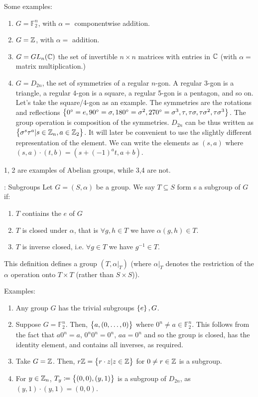 Some examples:
\begin{enumerate}
    \item $G = \mathbb{F}_2^n$, with $\alpha = $ componentwise addition.
    \item $G = \mathbb{Z}$, with $\alpha = $ addition.
    \item $G = GL_n(\mathbb{C})$ the set of invertible $n \times n$ matrices with entries in $\mathbb{C}$ (with $\alpha = $ matrix multiplication.)
    \item $G = D_{2n}$, the set of symmetries of a regular $n$-gon. A regular 3-gon is a triangle, a regular 4-gon is a square, a regular 5-gon is a pentagon, and so on. Let's take the square/4-gon as an example. The symmetries are the rotations and reflections $\set{0^\circ = e, 90^\circ = \sigma, 180^\circ = \sigma^2, 270^\circ = \sigma^3, \tau, \tau\sigma, \tau\sigma^2, \tau\sigma^3}$. The group operation is composition of the symmetries. $D_{2n}$ can be thus written as $\set{\sigma^s\tau^a \vert s \in \mathbb{Z}_n, a \in \mathbb{Z}_2}$. It will later be convenient to use the slightly different representation of the element. We can write the elements as $(s, a)$ where $(s, a)\cdot(t, b) = (s + (-1)^a t, a + b)$. 
\end{enumerate}
1, 2 are examples of Abelian groups, while 3,4 are not. 

\begin{defbox}{: Subgroups}
    Let $G = (S, \alpha)$ be a group. We say $T \subseteq S$ form s a subgroup of $G$ if:
    \begin{enumerate}
        \item $T$ contiains the $e$ of $G$
        \item $T$ is closed under $\alpha$, that is $\forall g, h \in T$ we have $\alpha(g, h) \in T$. 
        \item $T$ is inverse closed, i.e. $\forall g \in T$ we have $g^{-1} \in T$. 
    \end{enumerate}
    This definition defines a group $(T, \alpha\vert_T)$ (where $\alpha\vert_T$ denotes the restriction of the $\alpha$ operation onto $T \times T$ (rather than $S \times S$)).
\end{defbox}

Examples:
\begin{enumerate}
    \item Any group $G$ has the trivial subgroups $\set{e}, G$. 
    \item Suppose $G = \mathbb{F}_2^n$. Then, $\set{a, (0, \ldots, 0)}$ where $0^n \neq a \in \mathbb{F}_2^{n}$. This follows from the fact that $a 0^n = a$, $0^n 0^n = 0^n$, $aa = 0^n$ and so the group is closed, has the identity element, and contains all inverses, as required.
    \item Take $G = \mathbb{Z}$. Then, $r\mathbb{Z} = \set{r \cdot z \vert z \in \mathbb{Z}}$ for $0 \neq r \in \mathbb{Z}$ is a subgroup.
    \item For $y \in \mathbb{Z}_n$, $T_y \coloneqq \set{(0, 0), (y, 1)}$ is a subgroup of $D_{2n}$, as $(y, 1) \cdot (y, 1) = (0, 0)$. 
\end{enumerate}


